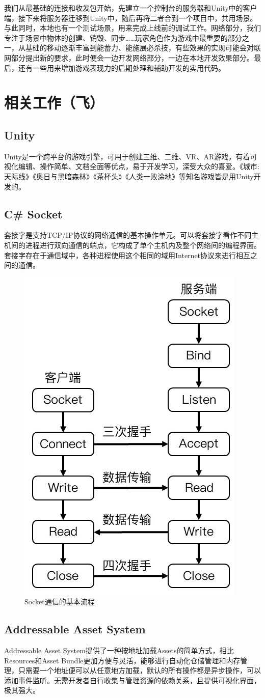 \documentclass[conference]{IEEEtran}
\begin{document}
我们从最基础的连接和收发包开始，先建立一个控制台的服务器和Unity中的客户端，接下来将服务器迁移到Unity中，随后再将二者合到一个项目中，共用场景。与此同时，本地也有一个测试场景，用来完成上线前的调试工作。网络部分，我们专注于场景中物体的创建、销毁、同步……玩家角色作为游戏中最重要的部分之一，从基础的移动逐渐丰富到能蓄力、能施展必杀技，有些效果的实现可能会对联网部分提出新的要求，此时便会一边开发网络部分，一边在本地开发效果部分。最后，还有一些用来增加游戏表现力的后期处理和辅助开发的实用代码。


\section{相关工作（飞）}
\subsection{Unity}
Unity是一个跨平台的游戏引擎，可用于创建三维、二维、VR、AR游戏，有着可视化编辑、操作简单、文档全面等优点，易于开发学习，深受大众的喜爱。《城市:天际线》《奥日与黑暗森林》《茶杯头》《人类一败涂地》等知名游戏皆是用Unity开发的。

\subsection{C\# Socket}
套接字是支持TCP/IP协议的网络通信的基本操作单元。可以将套接字看作不同主机间的进程进行双向通信的端点，它构成了单个主机内及整个网络间的编程界面。套接字存在于通信域中，各种进程使用这个相同的域用Internet协议来进行相互之间的通信。\cite{Unity3D网络游戏实战}

\begin{figure}[htbp]
    \centerline{\includegraphics[width=.22\textwidth]{images/Socket通信的基本流程.jpg}}
    \caption{Socket通信的基本流程}
    \label{fig:figure1}
\end{figure}


\subsection{Addressable Asset System}
Addressable Asset System提供了一种按地址加载Assets的简单方式，相比Resources和Asset Bundle更加方便与灵活，能够进行自动化仓储管理和内存管理，只需要一个地址便可以从任意地方加载，默认的所有操作都是异步操作，可以添加事件监听。无需开发者自行收集与管理资源的依赖关系，且提供可视化界面，极其强大。
\end{document}

